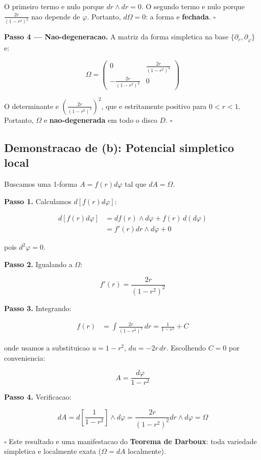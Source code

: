 \documentclass[12pt,a4paper,oneside]{article}
\begin{document}
O primeiro termo e nulo porque $dr \wedge dr = 0$. O segundo termo e nulo
porque $\frac{2r}{(1-r^2)^2}$ nao depende de $\varphi$. Portanto,
$d\Omega = 0$: a forma e \textbf{fechada}. $\square$

\textbf{Passo 4 — Nao-degeneracao.} A matriz da forma simpletica na base
$\{\partial_r, \partial_\varphi\}$ e:

$$\Omega = \begin{pmatrix}
0 & \frac{2r}{(1-r^2)^2} \\
-\frac{2r}{(1-r^2)^2} & 0
\end{pmatrix}$$

O determinante e $\left(\frac{2r}{(1-r^2)^2}\right)^2$, que e estritamente
positivo para $0 < r < 1$. Portanto, $\Omega$ e \textbf{nao-degenerada} em
todo o disco $D$. $\square$

\subsection*{Demonstracao de (b): Potencial simpletico local}

Buscamos uma 1-forma $A = f(r)d\varphi$ tal que $dA = \Omega$.

\textbf{Passo 1.} Calculamos $d[f(r)d\varphi]$:

\begin{align*}
d[f(r)d\varphi] &= df(r) \wedge d\varphi + f(r) \, d(d\varphi) \\
&= f'(r) dr \wedge d\varphi + 0
\end{align*}

pois $d^2\varphi = 0$.

\textbf{Passo 2.} Igualando a $\Omega$:

$$f'(r) = \frac{2r}{(1-r^2)^2}$$

\textbf{Passo 3.} Integrando:

\begin{align*}
f(r) &= \int \frac{2r}{(1-r^2)^2} \, dr
= \frac{1}{1-r^2} + C
\end{align*}

onde usamos a substituicao $u = 1-r^2$, $du = -2r\,dr$.
Escolhendo $C = 0$ por conveniencia:

$$A = \frac{d\varphi}{1-r^2}$$

\textbf{Passo 4.} Verificacao:

$$dA = d\left[\frac{1}{1-r^2}\right] \wedge d\varphi
= \frac{2r}{(1-r^2)^2} dr \wedge d\varphi = \Omega$$

$\square$ Este resultado e uma manifestacao do \textbf{Teorema de Darboux}:
toda variedade simpletica e localmente exata ($\Omega = dA$ localmente).
\end{document}
